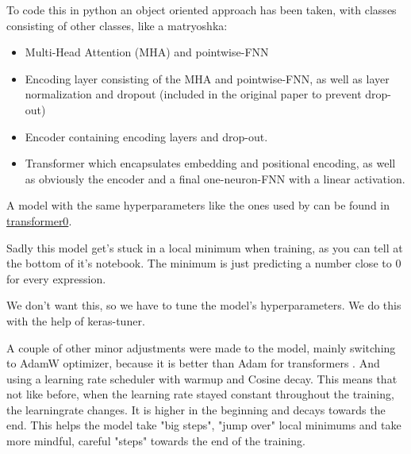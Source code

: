 \documentclass{article}
\begin{document}
To code this in python an object oriented approach has been taken, with 
classes consisting of other classes, like a matryoshka: 

\begin{itemize}
    \item Multi-Head Attention (MHA) and pointwise-FNN
    \item Encoding layer consisting of the MHA and pointwise-FNN, as well as 
layer normalization and dropout (included in the original paper to prevent 
drop-out)
    \item Encoder containing encoding layers and drop-out.
    \item Transformer which encapsulates embedding and positional encoding, 
as well as obviously the encoder and a final one-neuron-FNN with a linear 
activation.
\end{itemize}

A model with the same hyperparameters like the ones used by \cite{vaswani2023attentionneed} 
can be found in \href{https://github.com/AntonStantan/matura/blob/main/transformer/transformer0.ipynb}
{transformer0}.

Sadly this model get's stuck in a local minimum when training, as you can 
tell at the bottom of it's notebook. The minimum is just predicting a number 
close to 0 for every expression.

We don't want this, so we have to tune the model's hyperparameters.
We do this with the help of keras-tuner. 

A couple of other minor adjustments were made to the model, mainly switching to 
AdamW optimizer, because it is better than Adam for transformers \cite{loshchilov2019decoupledweightdecayregularization}. 
And using a learning rate scheduler with warmup and Cosine decay. This means 
that not like before, when the learning rate stayed constant throughout the 
training, the learningrate changes. It is higher in the beginning and decays 
towards the end. This helps the model take "big steps", "jump over" local 
minimums and take more mindful, careful "steps" towards the end of the training. 
\end{document}
